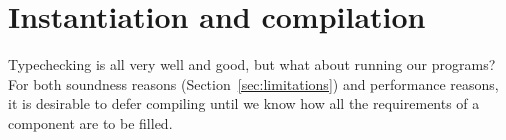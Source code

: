 



\section{Instantiation and compilation}
\label{sec:overview-instantiate}

Typechecking is all very well and good, but what about
running our programs?  For both soundness reasons (Section~\ref{sec:limitations})
and performance reasons, it is desirable to defer compiling
until we know how all the requirements of a component are to be
filled.

